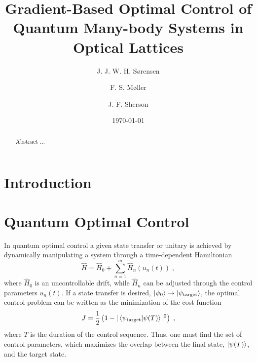 \documentclass[%
 reprint,
 amsmath,amssymb,
 aps,
pra,
]{revtex4-1}
\begin{document}

\title{Gradient-Based Optimal Control of Quantum Many-body Systems in Optical Lattices}%

\author{J. J. W. H. S\o rensen}
\author{F. S. M\o ller}
\author{J. F. Sherson}
\date{\today}%

\begin{abstract}
Abstract ...


\end{abstract}

\maketitle

\section{Introduction}

\section{Quantum Optimal Control}
In quantum optimal control a given state transfer or unitary is achieved by dynamically manipulating a system through a time-dependent Hamiltonian
\begin{equation}
	\hat{H} =  \hat{H}_0 + \sum_{n = 1}^{m}  \hat{H}_n (u_n(t)) \; ,
	\label{eq:ControlHamiltonians}
\end{equation} 
where $\hat{H}_0$ is an uncontrollable drift, while $\hat{H}_n$ can be adjusted through the control parameters $u_n(t)$. If a state transfer is desired, $\ket{\psi_0} \to \ket{\psi_{\mathrm{target}}}$, the optimal control problem can be written as the minimization of the cost function
\begin{equation}
	J = \frac{1}{2} \left( 1-|\braket{\psi_{\mathrm{target}} | \psi (T)}|^2 \right) \; ,
	\label{eq:infidelityCost}
\end{equation}
where $T$ is the duration of the control sequence. Thus, one must find the set of control parameters, which maximizes the overlap between the final state, $\ket{\psi (T)}$, and the target state.
\end{document}
